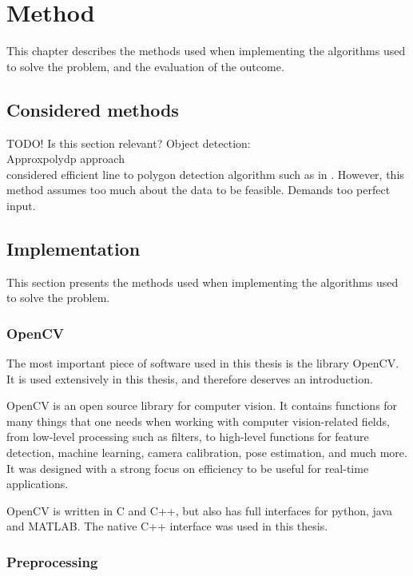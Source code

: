 \chapter{Method}

This chapter describes the methods used when implementing the algorithms used to solve the problem, and the evaluation of the outcome.

\section{Considered methods}
TODO! Is this section relevant? %
Object detection: \\
Approxpolydp approach\\
considered efficient line to polygon detection algorithm such as in \cite{joaquim2003polygon}.
However, this method assumes too much about the data to be feasible. Demands too perfect input.

\section{Implementation} \label{method:implementation}
This section presents the methods used when implementing the algorithms used to solve the problem. %

\subsection{OpenCV} %
The most important piece of software used in this thesis is the library OpenCV.
It is used extensively in this thesis, and therefore deserves an introduction.

OpenCV is an open source library for computer vision. %
It contains functions for many things that one needs when working with computer vision-related fields, from low-level processing such as filters, to high-level functions for feature detection, machine learning, camera calibration, pose estimation, and much more.
It was designed with a strong focus on efficiency to be useful for real-time applications. \cite{bradski2008learning}

OpenCV is written in C and C++, but also has full interfaces for python, java and MATLAB\cite{wiki:OpenCV}.
The native C++ interface was used in this thesis. %

\subsection{Preprocessing}


